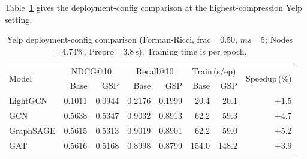 \begin{table}[ht]
\centering
\caption{Yelp best-sweep summary (frac\,=\,1.00). Per-model best configuration selected by highest GSP NDCG@10.}
\label{tab:yelp_summary}
\end{table}

Table~\ref{tab:yelp_detailed} gives the deployment-config comparison at the highest-compression Yelp setting.

\begin{table}[ht]
\centering
\caption{Yelp deployment-config comparison (Forman-Ricci, frac\,=\,0.50, $ms$\,=\,5; Nodes\,=\,4.74\%, Prepro\,=\,3.8\,s). Training time is per epoch.}
\label{tab:yelp_detailed}
\setlength{\tabcolsep}{5pt}
\begin{tabular}{l r r r r r r r}
\toprule
\multirow{2}{*}{Model} &
  \multicolumn{2}{c}{NDCG@10} & \multicolumn{2}{c}{Recall@10} &
  \multicolumn{2}{c}{Train\,(s/ep)} & \multirow{2}{*}{Speedup\,(\%)} \\
\cmidrule(lr){2-3}\cmidrule(lr){4-5}\cmidrule(lr){6-7}
 & Base & GSP & Base & GSP & Base & GSP & \\
\midrule
LightGCN  & 0.1011 & 0.0944 & 0.2176 & 0.1999 & 20.4 & 20.1 & $+1.5$ \\
GCN       & 0.5638 & 0.5347 & 0.9032 & 0.8913 & 62.2 & 59.3 & $+4.7$ \\
GraphSAGE & 0.5615 & 0.5313 & 0.9019 & 0.8901 & 62.2 & 59.0 & $+5.2$ \\
GAT       & 0.5616 & 0.5168 & 0.8998 & 0.8799 & 154.0 & 148.2 & $+3.9$ \\
\bottomrule
\end{tabular}
\end{table}

